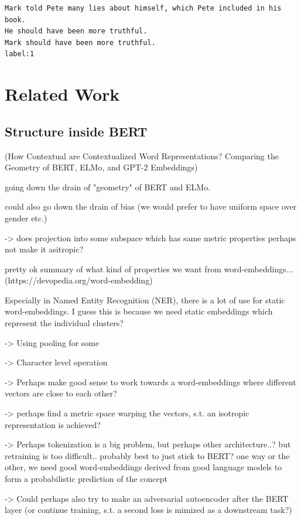 \documentclass[a4paper,12pt,twoside,openright]{report}
\begin{document}
\begin{verbatim}
Mark told Pete many lies about himself, which Pete included in his book. 
He should have been more truthful.	
Mark should have been more truthful.
label:1
\end{verbatim}




\chapter{Related Work}

\section{Structure inside BERT}

(How Contextual are Contextualized Word Representations? Comparing the Geometry of BERT, ELMo, and GPT-2 Embeddings)

going down the drain of "geometry" of BERT and ELMo.

could also go down the drain of bias (we would prefer to have uniform space over gender etc.)

-> does projection into some subspace which has same metric properties perhaps not make it asitropic?

pretty ok summary of what kind of properties we want from word-embeddings... (https://devopedia.org/word-embedding)


Especially in Named Entity Recognition (NER), there is a lot of use for static word-embeddings.
I guess this is because we need static embeddings which represent the individual clusters?

-> Using pooling for some 

-> Character level operation

-> Perhaps make good sense to work towards a word-embeddings where different vectors are close to each other?

-> perhaps find a metric space warping the vectors, s.t. an isotropic representation is achieved?

-> Perhaps tokenization is a big problem, but perhaps other architecture..? but retraining is too difficult.. probably best to just stick to BERT? one way or the other, we need good word-embeddings derived from good language models to form a probabilistic prediction of the concept


-> Could perhaps also try to make an adversarial autoencoder after the BERT layer (or continue training, s.t. a second loss is mimized as a downstream task?)
\end{document}

